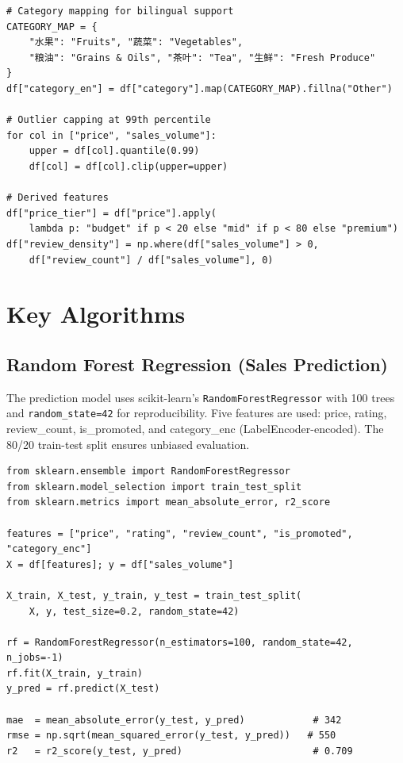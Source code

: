 \documentclass[12pt,a4paper]{report}
\begin{document}
\begin{lstlisting}[caption={Data cleaning --- core operations}, label=lst:cleaning]
# Category mapping for bilingual support
CATEGORY_MAP = {
    "水果": "Fruits", "蔬菜": "Vegetables",
    "粮油": "Grains & Oils", "茶叶": "Tea", "生鲜": "Fresh Produce"
}
df["category_en"] = df["category"].map(CATEGORY_MAP).fillna("Other")

# Outlier capping at 99th percentile
for col in ["price", "sales_volume"]:
    upper = df[col].quantile(0.99)
    df[col] = df[col].clip(upper=upper)

# Derived features
df["price_tier"] = df["price"].apply(
    lambda p: "budget" if p < 20 else "mid" if p < 80 else "premium")
df["review_density"] = np.where(df["sales_volume"] > 0,
    df["review_count"] / df["sales_volume"], 0)
\end{lstlisting}

\section{Key Algorithms}

\subsection{Random Forest Regression (Sales Prediction)}

The prediction model uses scikit-learn's \texttt{RandomForestRegressor} with 100 trees and \texttt{random\_state=42} for reproducibility. Five features are used: price, rating, review\_count, is\_promoted, and category\_enc (LabelEncoder-encoded). The 80/20 train-test split ensures unbiased evaluation.

\begin{lstlisting}[caption={Random Forest model training and evaluation}, label=lst:rf]
from sklearn.ensemble import RandomForestRegressor
from sklearn.model_selection import train_test_split
from sklearn.metrics import mean_absolute_error, r2_score

features = ["price", "rating", "review_count", "is_promoted", "category_enc"]
X = df[features]; y = df["sales_volume"]

X_train, X_test, y_train, y_test = train_test_split(
    X, y, test_size=0.2, random_state=42)

rf = RandomForestRegressor(n_estimators=100, random_state=42, n_jobs=-1)
rf.fit(X_train, y_train)
y_pred = rf.predict(X_test)

mae  = mean_absolute_error(y_test, y_pred)            # 342
rmse = np.sqrt(mean_squared_error(y_test, y_pred))   # 550
r2   = r2_score(y_test, y_pred)                       # 0.709
\end{lstlisting}
\end{document}

